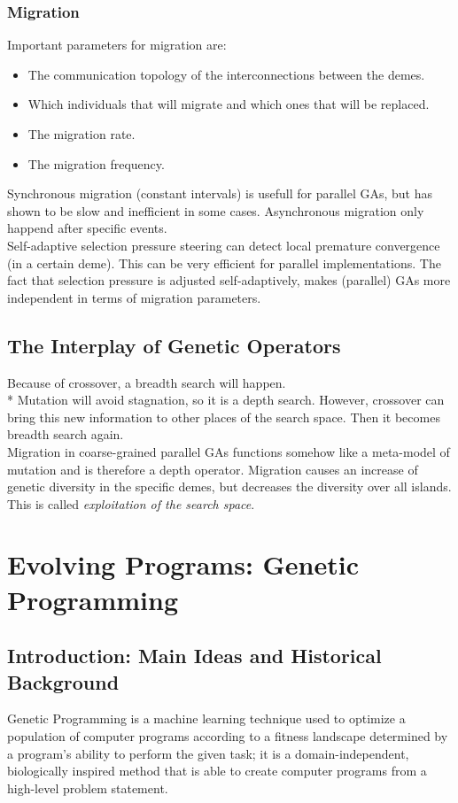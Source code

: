 \documentclass[12pt]{book}
\begin{document}
\subsection{Migration}
Important parameters for migration are:
\begin{itemize}
\item The communication topology of the interconnections between the demes.
\item Which individuals that will migrate and which ones that will be replaced.
\item The migration rate.
\item The migration frequency.
\end{itemize}
Synchronous migration (constant intervals) is usefull for parallel GAs, but has shown to be slow and inefficient in some cases. Asynchronous migration only happend after specific events.\\
Self-adaptive selection pressure steering can detect local premature convergence (in a certain deme). This can be very efficient for parallel implementations. The fact that selection pressure is adjusted self-adaptively, makes (parallel) GAs more independent in terms of migration parameters.
\section{The Interplay of Genetic Operators}
Because of crossover, a breadth search will happen.\\*
Mutation will avoid stagnation, so it is a depth search. However, crossover can bring this new information to other places of the search space. Then it becomes breadth search again.\\
Migration in coarse-grained parallel GAs functions somehow like a meta-model of mutation and is therefore a depth operator. Migration causes an increase of genetic diversity in the specific demes, but decreases the diversity over all islands. This is called \textit{exploitation of the search space}.
\clearpage
\chapter{Evolving Programs: Genetic Programming}
\section{Introduction: Main Ideas and Historical Background}
Genetic Programming is a machine learning technique used to optimize a population of computer programs according to a fitness landscape determined by a program's ability to perform the given task; it is a domain-independent, biologically inspired method that is able to create computer programs from a high-level problem statement.
\end{document}
